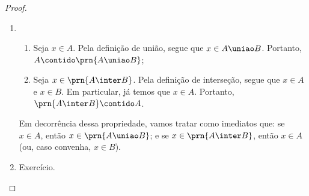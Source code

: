 \begin{proof}
\begin{enumerate}
        \item 	
            \begin{enumerate}
                \item
                    Seja $x \in A$. Pela definição de união, segue que $x \in A \uniao B$. Portanto, $A \contido \prn{A \uniao B}$;
                \item
                    Seja $x \in \prn{A \inter B}$. Pela definição de interseção, segue que $x\in A$ e $x \in B$. Em particular, já temos que $x \in A$. Portanto, $\prn{A \inter B} \contido A$.
            \end{enumerate}
            Em decorrência dessa propriedade, vamos tratar como imediatos que: se $x \in A$, então $x \in \prn{A \uniao B}$; e se $x \in \prn{A \inter B}$, então $x\in A$ (ou, caso convenha, $x\in B$).

        \item Exercício.


\end{enumerate}
\end{proof}
